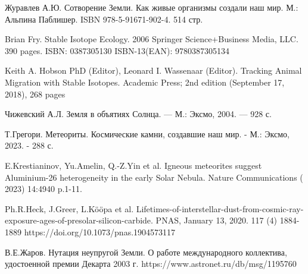 \documentclass[a5paper,openany]{book}
\begin{document}
\begin{thebibliography}{99}
		
		
		
		
		 Журавлев А.Ю. Сотворение Земли. Как живые организмы создали наш мир.
		М.: Альпина Паблишер. ISBN 978-5-91671-902-4. 514 стр.



 Brian Fry. Stable Isotope Ecology. 2006 Springer Science+Business Media, LLC. 390 pages. ISBN: 0387305130 ISBN-13(EAN): 9780387305134
 
 Keith A. Hobson PhD (Editor), Leonard I. Wassenaar (Editor). Tracking Animal Migration with Stable Isotopes. Academic Press; 2nd edition (September 17, 2018), 268 pages

		 Чижевский А.Л. Земля в объятиях Солнца. — М.: Эксмо, 2004. — 928 с.	
		
		Т.Грегори. Метеориты. Космические камни, создавшие наш мир. - М.: Эксмо, 2023. - 288 с.	
		
E.Krestianinov, Yu.Amelin, Q.-Z.Yin et al. Igneous meteorites suggest Aluminium-26 heterogeneity in the early Solar Nebula. Nature Communications ( 2023) 14:4940 p.1-11.

Ph.R.Heck, J.Greer, L.Kööpa et al.  Lifetimes-of-interstellar-dust-from-cosmic-ray-exposure-ages-of-presolar-silicon-carbide. PNAS, January 13, 2020. 117 (4) 1884-1889 https://doi.org/10.1073/pnas.1904573117

В.Е.Жаров. Нутация неупругой Земли. О работе международного коллектива, удостоенной премии Декарта 2003 г. https://www.astronet.ru/db/msg/1195760


\end{thebibliography}
\end{document}
